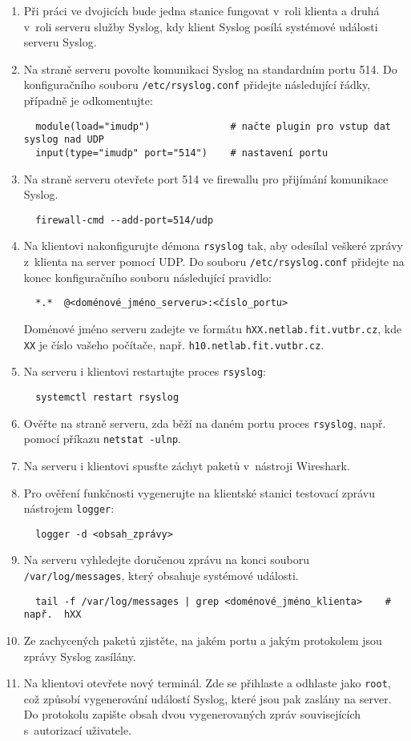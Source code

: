 \documentclass[a4paper,11pt]{article}
\begin{document}
\begin{enumerate}
  \item Při práci ve dvojicích bude jedna stanice fungovat v~roli klienta a druhá v~roli serveru služby Syslog, kdy klient Syslog posílá systémové události serveru Syslog.
  \item Na straně serveru povolte komunikaci Syslog na standardním portu 514. Do konfiguračního souboru {\tt /etc/rsyslog.conf} přidejte následující řádky, případně je odkomentujte:
    \vspace{-2mm}
\begin{verbatim}
  module(load="imudp")              # načte plugin pro vstup dat syslog nad UDP
  input(type="imudp" port="514")    # nastavení portu
\end{verbatim}
  \item Na straně serveru otevřete port 514 ve firewallu pro přijímání komunikace Syslog.
\begin{verbatim}
  firewall-cmd --add-port=514/udp
\end{verbatim}
  \item  Na klientovi nakonfigurujte démona {\tt rsyslog} tak, aby odesílal veškeré zprávy z~klienta na server pomocí UDP.
    Do souboru {\tt /etc/rsyslog.conf} přidejte na konec konfiguračního souboru následující pravidlo:
\begin{verbatim}
  *.*  @<doménové_jméno_serveru>:<číslo_portu>
\end{verbatim}
    {\small Doménové jméno serveru zadejte ve formátu \texttt{hXX.netlab.fit.vutbr.cz}, kde \texttt{XX} je číslo vašeho počítače, např. \texttt{h10.netlab.fit.vutbr.cz}.}
  \item Na serveru i klientovi restartujte proces {\tt rsyslog}:
\begin{verbatim}
  systemctl restart rsyslog
\end{verbatim}
  \item Ověřte na straně serveru, zda běží na daném portu proces {\tt rsyslog}, např. pomocí příkazu \verb|netstat -ulnp|.
  \item Na serveru i klientovi spusťte záchyt paketů v~nástroji Wireshark.
  \item Pro ověření funkčnosti vygenerujte na klientské stanici testovací zprávu nástrojem {\tt logger}:
\begin{verbatim}
  logger -d <obsah_zprávy>
\end{verbatim}
  \item Na serveru vyhledejte doručenou zprávu na konci souboru {\tt /var/log/messages}, který obsahuje
        systémové události.
\begin{verbatim}
  tail -f /var/log/messages | grep <doménové_jméno_klienta>    # např.  hXX
\end{verbatim}
  \item Ze zachycených paketů zjistěte, na jakém portu a jakým protokolem jsou zprávy Syslog zasílány.
  \item Na klientovi otevřete nový terminál. Zde se přihlaste a odhlaste jako {\tt root}, což způsobí vygenerování událostí Syslog, které jsou pak zaslány na server. Do protokolu zapište obsah dvou vygenerovaných zpráv souvisejících s~autorizací uživatele.
\end{enumerate}
\end{document}
